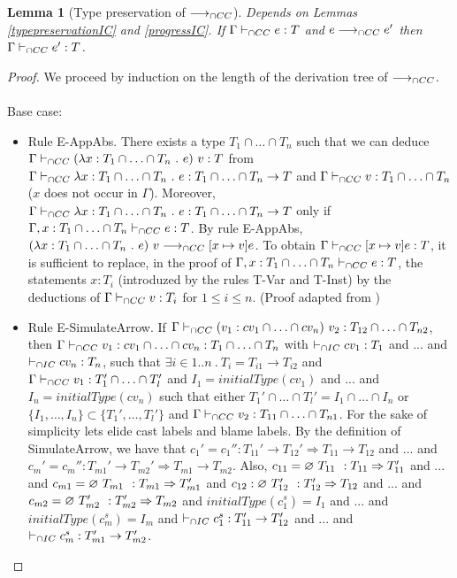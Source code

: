 \documentclass[a4paper]{article}
\newtheorem{lemma}{Lemma}
\begin{document}
\begin{lemma}[Type preservation of $\longrightarrow_{\cap CC}$]
\label{typepreservation}
Depends on Lemmas \ref{typepreservationIC} and \ref{progressIC}.
If $\Gamma \vdash_{\cap CC} e : T$ and $e \longrightarrow_{\cap CC} e'$ then $\Gamma \vdash_{\cap CC} e' : T$.
\end{lemma}
\begin{proof}
We proceed by induction on the length of the derivation tree of $\longrightarrow_{\cap CC}$.\\\\
Base case:
\begin{itemize}
    \item Rule E-AppAbs.
    There exists a type $T_1 \cap \ldots \cap T_n$ such that we can deduce $\Gamma \vdash_{\cap CC} (\lambda x : T_1 \cap \ldots \cap T_n\ .\ e)\ v : T$ from $\Gamma \iccts \lambda x : T_1 \cap \ldots \cap T_n\ .\ e : T_1 \cap \ldots \cap T_n \rightarrow T$ and $\Gamma \vdash_{\cap CC} v : T_1 \cap \ldots \cap T_n$ ($x$ does not occur in $\Gamma$).
    Moreover, $\Gamma \iccts \lambda x : T_1 \cap \ldots \cap T_n\ .\ e : T_1 \cap \ldots \cap T_n \rightarrow T$ only if $\Gamma, x : T_1 \cap \ldots \cap T_n \vdash_{\cap CC} e : T$.
    By rule E-AppAbs, $(\lambda x : T_1 \cap \ldots \cap T_n\ .\ e)\ v \longrightarrow_{\cap CC} [x \mapsto v] e$.
    To obtain $\Gamma \vdash_{\cap CC} [x \mapsto v] e : T$, it is sufficient to replace, in the proof of $\Gamma, x : T_1 \cap \ldots \cap T_n \vdash_{\cap CC} e : T$, the statements $x : T_i$ (introduzed by the rules T-Var and T-Inst) by the deductions of $\Gamma \vdash_{\cap CC} v : T_i$ for $1 \leq i \leq n$.
    (Proof adapted from \cite{coppo1980extension})
    \item Rule E-SimulateArrow.
    If $\Gamma \vdash_{\cap CC} (v_1 : cv_1 \cap \ldots \cap cv_n)\ v_2 : T_{12} \cap \ldots \cap T_{n2}$, then $\Gamma \vdash_{\cap CC} v_1 : cv_1 \cap \ldots \cap cv_n : T_1 \cap \ldots \cap T_n$ with $\vdash_{\cap IC} cv_1 : T_1$ and ... and $\vdash_{\cap IC} cv_n : T_n$, such that $\exists i \in 1 .. n\ .\ T_i = T_{i1} \rightarrow T_{i2}$ and $\Gamma \vdash_{\cap CC} v_1 : T_1' \cap \ldots \cap T_l'$ and $I_1 = initialType(cv_1)$ and ... and $I_n = initialType(cv_n)$ such that either $T_1' \cap \ldots \cap T_l' = I_1 \cap \ldots \cap I_n$ or $\{I_1, \ldots, I_n\} \subset \{T_1', \ldots, T_l'\}$ and $\Gamma \vdash_{\cap CC} v_2 : T_{11} \cap \ldots \cap T_{n1}$.
    For the sake of simplicity lets elide cast labels and blame labels.
    By the definition of SimulateArrow, we have that $c_1' = c_1'' : T_{11}' \rightarrow T_{12}' \Rightarrow T_{11} \rightarrow T_{12}$ and ... and $c_m' = c_m'' : T_{m1}' \rightarrow T_{m2}' \Rightarrow T_{m1} \rightarrow T_{m2}$.
    Also, $c_{11} = \varnothing\ T_{11}\ ^{} : T_{11} \Rightarrow T_{11}'$ and ... and $c_{m1} = \varnothing\ T_{m1}\ ^{} : T_{m1} \Rightarrow T_{m1}'$ and $c_{12} : \varnothing\ T_{12}'\ ^{} : T_{12}' \Rightarrow T_{12}$ and ... and $c_{m2} = \varnothing\ T_{m2}'\ ^{} : T_{m2}' \Rightarrow T_{m2}$ and $initialType(c^s_1) = I_1$ and ... and $initialType(c^s_m) = I_m$ and $\vdash_{\cap IC} c^s_1 : T_{11}' \rightarrow T_{12}'$ and ... and $\vdash_{\cap IC} c^s_m : T_{m1}' \rightarrow T_{m2}'$.

\end{itemize}
\end{proof}
\end{document}
